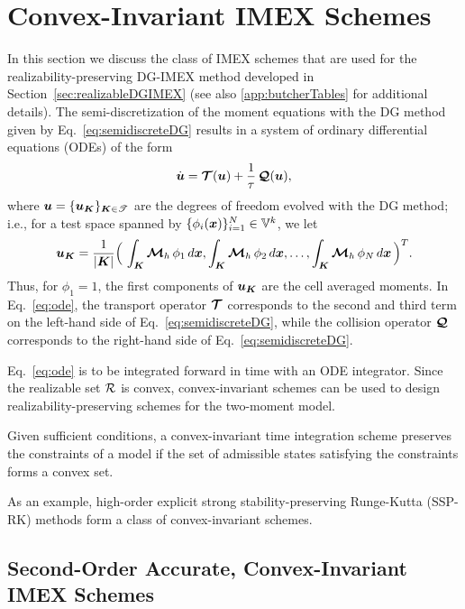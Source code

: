 \section{Convex-Invariant IMEX Schemes}
\label{sec:imex}

In this section we discuss the class of IMEX schemes that are used for the realizability-preserving DG-IMEX method developed in Section~\ref{sec:realizableDGIMEX} (see also \ref{app:butcherTables} for additional details).  
The semi-discretization of the moment equations with the DG method given by Eq.~\eqref{eq:semidiscreteDG} results in a system of ordinary differential equations (ODEs) of the form
\begin{equation}
  \dot{\boldsymbol{u}}
  =\boldsymbol{\mathcal{T}}(\boldsymbol{u})+\frac{1}{\tau}\,\boldsymbol{\mathcal{Q}}(\boldsymbol{u}),
  \label{eq:ode}
\end{equation}
where $\boldsymbol{u}=\{\boldsymbol{u}_{\boldsymbol{K}}\}_{\boldsymbol{K}\in\mathscr{T}}$ are the degrees of freedom evolved with the DG method; i.e., for a test space spanned by $\{\phi_{i}(\boldsymbol{x})\}_{i=1}^{N}\in\mathbb{V}^{k}$, we let
\begin{equation}
  \boldsymbol{u}_{\boldsymbol{K}}=\frac{1}{|\boldsymbol{K}|}\Big(\,\int_{\boldsymbol{K}}\boldsymbol{\mathcal{M}}_{h}\,\phi_{1}\,d\boldsymbol{x},\int_{\boldsymbol{K}}\boldsymbol{\mathcal{M}}_{h}\,\phi_{2}\,d\boldsymbol{x},\ldots,\int_{\boldsymbol{K}}\boldsymbol{\mathcal{M}}_{h}\,\phi_{N}\,d\boldsymbol{x}\,\Big)^{T}.
\end{equation}
Thus, for $\phi_{1}=1$, the first components of $\boldsymbol{u}_{\boldsymbol{K}}$ are the cell averaged moments.  
In Eq.~\eqref{eq:ode}, the transport operator $\boldsymbol{\mathcal{T}}$ corresponds to the second and third term on the left-hand side of Eq.~\eqref{eq:semidiscreteDG}, while the collision operator $\boldsymbol{\mathcal{Q}}$ corresponds to the right-hand side of Eq.~\eqref{eq:semidiscreteDG}.  

Eq.~\eqref{eq:ode} is to be integrated forward in time with an ODE integrator.  
Since the realizable set $\mathcal{R}$ is convex, convex-invariant schemes can be used to design realizability-preserving schemes for the two-moment model.  
\begin{define}
  Given sufficient conditions, a convex-invariant time integration scheme preserves the constraints of a model if the set of admissible states satisfying the constraints forms a convex set.  
  \label{def:constraintPreserving}
\end{define}
As an example, high-order explicit strong stability-preserving Runge-Kutta (SSP-RK) methods form a class of convex-invariant schemes.  

\subsection{Second-Order Accurate, Convex-Invariant IMEX Schemes}

